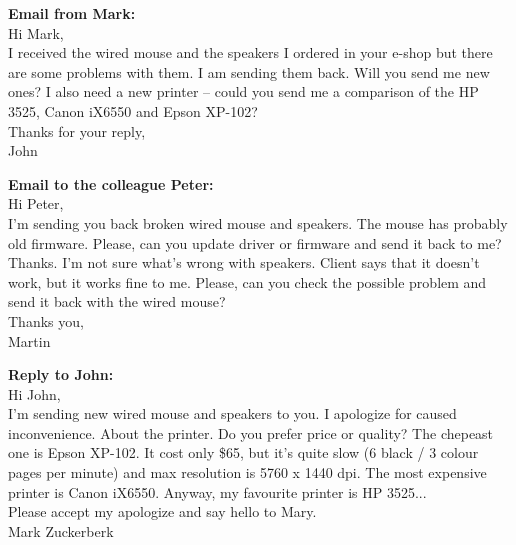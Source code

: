 \documentclass[12pt]{article} %
\begin{document}
\textbf{Email from Mark:}\\
Hi Mark,\\
I received the wired mouse and the speakers I ordered in your e-shop but there are some problems with them. I am sending them back. Will you send me new ones?
I also need a new printer – could you send me a comparison of the HP 3525, Canon iX6550 and Epson XP-102?\\
Thanks for your reply,\\
John

\textbf{Email to the colleague Peter:}\\
Hi Peter,\\
I'm sending you back broken wired mouse and speakers. The mouse has probably old firmware. Please, can you update driver or firmware and send it back to me? Thanks. I'm not sure what's wrong with speakers. Client says that it doesn't work, but it works fine to me. Please, can you check the possible problem and send it back with the wired mouse?\\
Thanks you,\\
Martin

\textbf{Reply to John:}\\
Hi John,\\
I'm sending new wired mouse and speakers to you. I apologize for caused inconvenience. About the printer. Do you prefer price or quality? The chepeast one is Epson XP-102. It cost only \$65, but it's quite slow (6 black / 3 colour pages per minute) and max resolution is 5760 x 1440 dpi. The most expensive printer is Canon iX6550. Anyway, my favourite  printer is HP 3525...\\
Please accept my apologize and say hello to Mary.\\
Mark Zuckerberk

\end{document}
